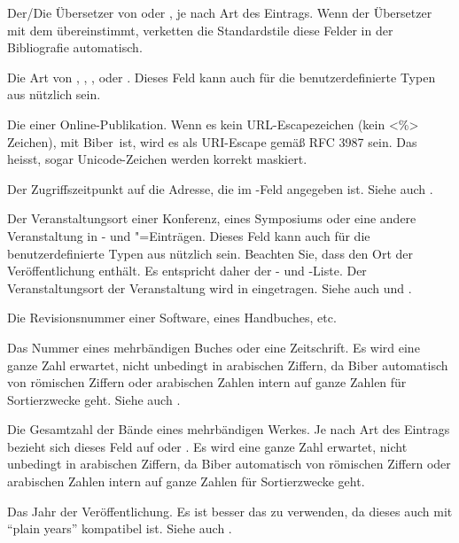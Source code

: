 \documentclass{ltxdockit}[2011/03/25]
\newcommand*{\biber}{Biber\xspace}
\begin{document}
\begin{fieldlist}

Der/Die Übersetzer von  oder , je nach Art
des Eintrags. Wenn der Übersetzer mit dem  übereinstimmt,
verketten die Standardstile diese Felder in der Bibliografie automatisch.


Die Art von , , , oder
. Dieses Feld kann auch für die benutzerdefinierte Typen aus
 nützlich sein.


Die  einer Online-Publikation. Wenn es kein URL-Escapezeichen (kein <\%> Zeichen),
mit \biber\ ist, wird es als URI-Escape gemäß RFC 3987 sein. Das heisst, sogar 
Unicode-Zeichen werden korrekt maskiert.


Der Zugriffszeitpunkt auf die Adresse, die im -Feld angegeben ist.
Siehe auch .


Der Veranstaltungsort einer Konferenz, eines Symposiums oder eine andere
Veranstaltung in - und "=Einträgen.
Dieses Feld kann auch für die benutzerdefinierte Typen aus 
nützlich sein. Beachten Sie, dass  den Ort der
Veröffentlichung enthält. Es entspricht daher der - und
-Liste. Der Veranstaltungsort der Veranstaltung wird in
 eingetragen. Siehe auch  und
.


Die Revisionsnummer einer Software, eines Handbuches, etc.


Das Nummer eines mehrbändigen Buches oder eine Zeitschrift. Es wird eine ganze Zahl erwartet, nicht unbedingt in arabischen Ziffern, da \biber automatisch von römischen Ziffern oder arabischen Zahlen
intern auf ganze Zahlen für Sortierzwecke geht. Siehe auch .


Die Gesamtzahl der Bände eines mehrbändigen Werkes. Je nach Art des Eintrags
bezieht sich dieses Feld auf  oder .
Es wird eine ganze Zahl erwartet, nicht unbedingt in arabischen Ziffern, da \biber automatisch von römischen Ziffern oder arabischen Zahlen
intern auf ganze Zahlen für Sortierzwecke geht.


Das Jahr der Veröffentlichung. Es ist besser das  zu verwenden, da dieses auch mit
"`plain years"' kompatibel ist. Siehe auch .

\end{fieldlist}
\end{document}
